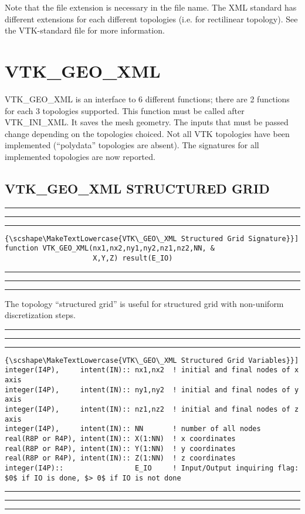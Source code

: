 \documentclass[pagesize=pdftex,fontsize=10pt,paper=a4,oneside]{scrbook}
\DeclareRobustCommand{\MarginNote}[1]{\marginpar{%
\slshape\footnotesize%
\parindent=0pt\lineskip=0pt\lineskiplimit=0pt%
\tolerance=2000\hyphenpenalty=300\exhyphenpenalty=300%
\doublehyphendemerits=100000\finalhyphendemerits=\doublehyphendemerits%
\raggedright\hspace{0pt}#1}}
\newenvironment{boxred}[1]%
               {%
                \noindent\hspace*{-0.025\textwidth}%
                \color{Maroon}%
                \rule[-5.8pt]{0.6pt}{6pt}\hspace*{-0.6pt}\rule{1.05\textwidth}{0.6pt}\hspace*{-0.6pt}\rule[-5.8pt]{0.6pt}{6pt}%
                \color{black}%
                \vspace*{0.6pt}\MarginNote{\color{Maroon}{#1}}%
               }%
               {%
                \noindent\hspace*{-0.025\textwidth}%
                \color{Maroon}%
                \rule[0pt]{0.6pt}{6pt}\hspace*{-0.6pt}\rule{1.05\textwidth}{0.6pt}\hspace*{-0.6pt}\rule[0pt]{0.6pt}{6pt}%
                \color{black}%
                \vspace*{2mm}%
               }
\newcommand{\virgo}[1]{``{#1}''}
\DeclareRobustCommand{\MaiuscolettoBS}[1]{\textls[80]{\scshape\MakeTextLowercase{#1}}}
\begin{document}
\noindent Note that the file extension is necessary in the file name. The XML standard has different extensions for each
different topologies (i.e. \MaiuscolettoBS{.vtr} for rectilinear topology). See the VTK-standard file for more information.


\section{VTK\_GEO\_XML}

VTK\_GEO\_XML is an interface to 6 different functions; there are 2 functions for each 3 topologies supported.
This function must be called after VTK\_INI\_XML. It saves the mesh geometry. The inputs that must be passed change
depending on the topologies choiced. Not all VTK topologies have been implemented (\virgo{polydata} topologies are absent).
The signatures for all implemented topologies are now reported.

\subsection{VTK\_GEO\_XML STRUCTURED GRID}

\begin{boxred}{}
\begin{lstlisting}[style=signature,title=\color{Maroon}\MaiuscolettoBS{VTK\_GEO\_XML Structured Grid Signature}]
function VTK_GEO_XML(nx1,nx2,ny1,ny2,nz1,nz2,NN, &
                     X,Y,Z) result(E_IO)
\end{lstlisting}
\end{boxred}

The topology \virgo{structured grid} is useful for structured grid with non-uniform discretization steps.

\begin{boxred}{}
\begin{lstlisting}[style=variables,title=\color{Maroon}\MaiuscolettoBS{VTK\_GEO\_XML Structured Grid Variables}]
integer(I4P),     intent(IN):: nx1,nx2  ! initial and final nodes of x axis
integer(I4P),     intent(IN):: ny1,ny2  ! initial and final nodes of y axis
integer(I4P),     intent(IN):: nz1,nz2  ! initial and final nodes of z axis
integer(I4P),     intent(IN):: NN       ! number of all nodes
real(R8P or R4P), intent(IN):: X(1:NN)  ! x coordinates
real(R8P or R4P), intent(IN):: Y(1:NN)  ! y coordinates
real(R8P or R4P), intent(IN):: Z(1:NN)  ! z coordinates
integer(I4P)::                 E_IO     ! Input/Output inquiring flag: $0$ if IO is done, $> 0$ if IO is not done
\end{lstlisting}
\end{boxred}
\end{document}
